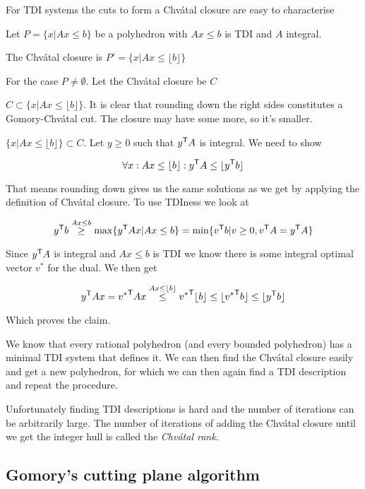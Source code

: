 For TDI systems the cuts to form a Chv\'{a}tal closure are easy to characterise

\begin{thm} Let $P=\{x|Ax\leq b\}$ be a polyhedron with $Ax\leq b$ is TDI and $A$ integral. 

The Chv\'{a}tal closure is $P'=\{x|Ax\leq \lfloor b\rfloor\}$
\end{thm}

\begin{pr}[]For the case $P\neq \emptyset$. Let the Chv\'{a}tal closure be $C$

$C\subset \{x|Ax\leq \lfloor b\rfloor\}$. It is clear that rounding down the right sides constitutes a Gomory-Chv\'{a}tal cut. The closure may have some more, so it's smaller.

$\{x|Ax\leq \lfloor b\rfloor\} \subset C$. Let $y\geq 0$ such that ${y}^\text{\upshape \sffamily T} A$ is integral. We need to show 

\[\forall x: Ax\leq \lfloor b \rfloor: {y}^\text{\upshape \sffamily T} A \leq \lfloor {y}^\text{\upshape \sffamily T} b\rfloor\]

That means rounding down gives us the same solutions as we get by applying the definition of Chv\'{a}tal closure. To use TDIness we look at

\[{y}^\text{\upshape \sffamily T}b \stackrel{Ax\leq b}{\geq} \max \{{y}^\text{\upshape \sffamily T} Ax | Ax\leq b\} = \min \{{v}^\text{\upshape \sffamily T} b|v\geq 0, {v}^\text{\upshape \sffamily T} A = {y}^\text{\upshape \sffamily T} A\}\]

Since ${y}^\text{\upshape \sffamily T} A$ is integral and $Ax\leq b$ is TDI we know there is some integral optimal vector $v^*$ for the dual. We then get

\[{y}^\text{\upshape \sffamily T} A x ={v^*}^\text{\upshape \sffamily T} A x \stackrel{Ax\leq \lfloor b\rfloor}{\leq} {v^*}^\text{\upshape \sffamily T} \lfloor b\rfloor \leq \lfloor {v^*}^\text{\upshape \sffamily T} b\rfloor \leq \lfloor {y}^\text{\upshape \sffamily T} b\rfloor\]

Which proves the claim.
\end{pr}

We know that every rational polyhedron (and every bounded polyhedron) has a minimal TDI system that defines it. We can then find the Chv\'{a}tal closure easily and get a new polyhedron, for which we can then again find a TDI description and repeat the procedure.

Unfortunately finding TDI descriptions is hard and the number of iterations can be arbitrarily large. The number of iterations of adding the Chv\'{a}tal closure until we get the integer hull is called the \emph{Chv\'{a}tal rank}.

\subsection{Gomory's cutting plane algorithm}

